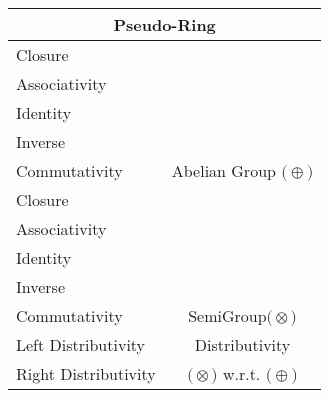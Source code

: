 \documentclass[a4paper,12pt]{scrartcl}
\newcommand{\OpA}{\otimes}
\newcommand{\OpB}{\oplus}
\begin{document}
\begin{minipage}[c]{0,5\textwidth}
\vspace{0.6cm}
\begin{tabular}{|l|c|} %
  \hline
  \multicolumn{2}{c}{\cellcolor{green!25}Pseudo-Ring} \\
  \hline
    \cellcolor{blue!25} Closure& \cellcolor{yellow!25}  \\
    \cellcolor{blue!25} Associativity& \cellcolor{yellow!25}  \\
    \cellcolor{blue!25} Identity& \cellcolor{yellow!25} \\
    \cellcolor{blue!25} Inverse& \cellcolor{yellow!25} \\
    \cellcolor{blue!25} Commutativity& \multirow{-5}{*}{\tiny\cellcolor{yellow!25}Abelian Group $\big(\OpB\big)$} \\
   \hline
    \cellcolor{blue!25} Closure& \cellcolor{yellow!25}  \\
    \cellcolor{blue!25} Associativity& \cellcolor{yellow!25}  \\
    \cellcolor{red!25} Identity& \cellcolor{yellow!25} \\
    \cellcolor{red!25} Inverse& \cellcolor{yellow!25} \\
    \cellcolor{red!25} Commutativity& \multirow{-5}{*}{\tiny\cellcolor{yellow!25}SemiGroup$\big(\OpA\big)$} \\
  \hline
  	\cellcolor{blue!25} Left Distributivity&  \tiny\cellcolor{yellow!25}Distributivity\\
    \cellcolor{blue!25} Right Distributivity & \tiny\cellcolor{yellow!25} $\big(\OpA\big)$ w.r.t. $\big(\OpB\big)$  \\
   \hline
\end{tabular}

\end{minipage}
\end{document}
